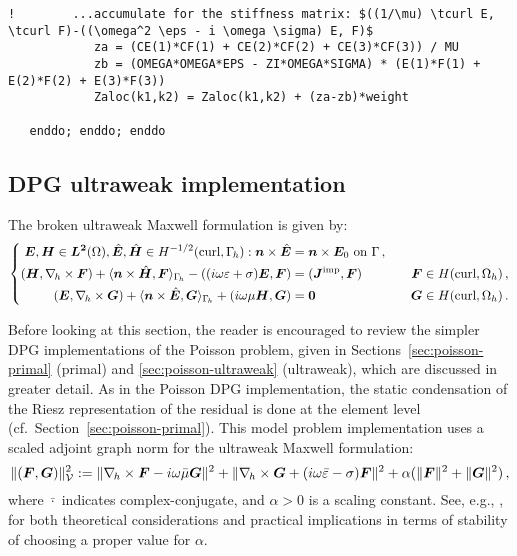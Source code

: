 \begin{lstlisting}[mathescape,caption=\file{MAXWELL/GALERKIN/}\routine{elem} routine]
!        ...accumulate for the stiffness matrix: $((1/\mu) \tcurl E, \tcurl F)-((\omega^2 \eps - i \omega \sigma) E, F)$
            za = (CE(1)*CF(1) + CE(2)*CF(2) + CE(3)*CF(3)) / MU
            zb = (OMEGA*OMEGA*EPS - ZI*OMEGA*SIGMA) * (E(1)*F(1) + E(2)*F(2) + E(3)*F(3))
            Zaloc(k1,k2) = Zaloc(k1,k2) + (za-zb)*weight

   enddo; enddo; enddo
\end{lstlisting}

\subsection{DPG ultraweak implementation}
\label{sec:maxwell-ultraweak}

The broken ultraweak Maxwell formulation is given by:
\[
\left\{
\begin{split}
	\boldsymbol E, \boldsymbol H \in \boldsymbol{L^2}(\Omega), \hat{\boldsymbol E}, \hat{\boldsymbol H} \in H^{-1/2}(\text{curl}, \Gamma_{\hskip -1pt h}): \boldsymbol n \times \hat{\boldsymbol E} &= \boldsymbol n \times \boldsymbol E_0 \text{ on } \Gamma \, , \\
	(\boldsymbol H, \nabla_{\hspace{-1pt}h} \times \boldsymbol F) + \langle \boldsymbol n \times \hat{\boldsymbol H}, \boldsymbol F \rangle_{\Gamma_{\hskip -1pt h}} - ((i \omega \varepsilon + \sigma) \boldsymbol E , \boldsymbol F)
	&= (\boldsymbol J^{\text{imp}}, \boldsymbol F) &\quad \boldsymbol F \in H(\text{curl}, \Omega_h) \, , \\
	(\boldsymbol E, \nabla_{\hspace{-1pt}h} \times \boldsymbol G) + \langle \boldsymbol n \times \hat{\boldsymbol E}, \boldsymbol G \rangle_{\Gamma_{\hskip -1pt h}} + (i \omega \mu \boldsymbol H, \boldsymbol G)
	&= \boldsymbol 0 &\quad \boldsymbol G \in H(\text{curl}, \Omega_h) \, .
\end{split}
\right .
\]

Before looking at this section, the reader is encouraged to review the simpler DPG implementations of the Poisson problem, given in Sections~\ref{sec:poisson-primal} (primal) and \ref{sec:poisson-ultraweak} (ultraweak), which are discussed in greater detail. As in the Poisson DPG implementation, the static condensation of the Riesz representation of the residual is done at the element level (cf.~Section~\ref{sec:poisson-primal}). This model problem implementation uses a scaled adjoint graph norm for the ultraweak Maxwell formulation:
\[
	\| ( \boldsymbol F, \boldsymbol G ) \|^2_{\mathcal{V}} :=
	\| \nabla_{\hspace{-1pt}h} \times \boldsymbol F - i \omega \bar{\mu} \boldsymbol G \|^2 +
	\| \nabla_{\hspace{-1pt}h} \times \boldsymbol G + (i \omega \bar{\varepsilon} - \sigma) \boldsymbol F \|^2 +
	\alpha ( \| \boldsymbol F \|^2 + \| \boldsymbol G \|^2) \, ,
\]
where $\bar{\cdot}$ indicates complex-conjugate, and $\alpha > 0$ is a scaling constant. See, e.g., \cite{melenk2023waveguide1, demkowicz2024waveguide2}, for both theoretical considerations and practical implications in terms of stability of choosing a proper value for $\alpha$.

